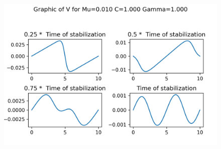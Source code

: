 \begin{figure}[H]
	\includegraphics[scale=0.5]{../graphs_data_nonsmooth_1/slices/Graph_V_mu0.010_C1.000_gamma1.000.png}
\end{figure}

